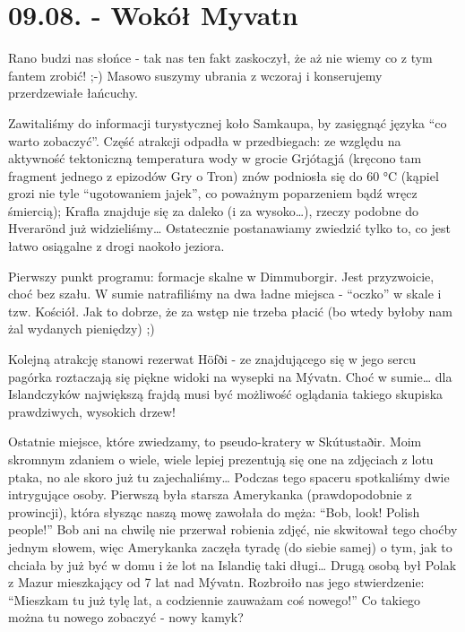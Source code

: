 \chapter{09.08. - Wokół Myvatn}

Rano budzi nas słońce - tak nas ten fakt zaskoczył, że aż nie wiemy co z tym fantem zrobić! ;-) Masowo suszymy ubrania z wczoraj i konserujemy przerdzewiałe łańcuchy.

Zawitaliśmy do informacji turystycznej koło Samkaupa, by zasięgnąć języka “co warto zobaczyć”. Część atrakcji odpadła w przedbiegach: ze względu na aktywność tektoniczną temperatura wody w grocie Grjótagjá (kręcono tam fragment jednego z epizodów Gry o Tron) znów podniosła się do 60 °C (kąpiel grozi nie tyle “ugotowaniem jajek”, co poważnym poparzeniem bądź wręcz śmiercią); Krafla znajduje się za daleko (i za wysoko…), rzeczy podobne do Hverarönd już widzieliśmy… Ostatecznie postanawiamy zwiedzić tylko to, co jest łatwo osiągalne z drogi naokoło jeziora.

Pierwszy punkt programu: formacje skalne w Dimmuborgir. Jest przyzwoicie, choć bez szału. W sumie natrafiliśmy na dwa ładne miejsca - “oczko” w skale i tzw. Kościół. Jak to dobrze, że za wstęp nie trzeba płacić (bo wtedy byłoby nam żal wydanych pieniędzy) ;)


Kolejną atrakcję stanowi rezerwat Höfði - ze znajdującego się w jego sercu pagórka roztaczają się piękne widoki na wysepki na Mývatn. Choć w sumie… dla Islandczyków największą frajdą musi być możliwość oglądania takiego skupiska prawdziwych, wysokich drzew!

Ostatnie miejsce, które zwiedzamy, to pseudo-kratery w Skútustaðir. Moim skromnym zdaniem o wiele, wiele lepiej prezentują się one na zdjęciach z lotu ptaka, no ale skoro już tu zajechaliśmy… Podczas tego spaceru spotkaliśmy dwie intrygujące osoby. Pierwszą była starsza Amerykanka (prawdopodobnie z prowincji), która słysząc naszą mowę zawołała do męża: “Bob, look! Polish people!” Bob ani na chwilę nie przerwał robienia zdjęć, nie skwitował tego choćby jednym słowem, więc Amerykanka zaczęła tyradę (do siebie samej) o tym, jak to chciała by już być w domu i że lot na Islandię taki długi… Drugą osobą był Polak z Mazur mieszkający od 7 lat nad Mývatn. Rozbroiło nas jego stwierdzenie: “Mieszkam tu już tylę lat, a codziennie zauważam coś nowego!” Co takiego można tu nowego zobaczyć - nowy kamyk?


